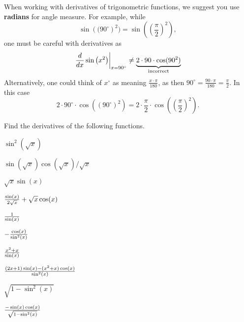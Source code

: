 \begin{warning}
When working with derivatives of trigonometric functions, we suggest
you use \textbf{radians} for angle measure. For example, while
\[
\sin\left((90^\circ\right)^2) = \sin\left(\left(\frac{\pi}{2}\right)^2\right),
\]
one must be careful with derivatives as
\[
\left. \frac{d}{dx} \sin\left(x^2\right)\right|_{x=90^\circ} \ne \underbrace{2\cdot 90\cdot \cos(90^2)}_{\text{incorrect}}
\]
Alternatively, one could think of $x^\circ$ as meaning
$\frac{x\cdot\pi}{180}$, as then $90^\circ = \frac{90\cdot\pi}{180} =
\frac{\pi}{2}$. In this case
\[
2\cdot 90^\circ\cdot \cos((90^\circ)^2) = 2\cdot \frac{\pi}{2}\cdot\cos\left(\left(\frac{\pi}{2}\right)^2\right).
\]
\end{warning}



\begin{exercises}
Find the derivatives of the following functions.

\twocol

\begin{exercise} $\sin^2(\sqrt{x})$
\begin{answer} $\sin(\sqrt{x})\cos(\sqrt{x})/\sqrt{x}$
\end{answer}\end{exercise}

\begin{exercise} $\sqrt{x}\sin(x)$
\begin{answer} ${\sin(x)\over2\sqrt x}+\sqrt{x}\cos(x)$
\end{answer}\end{exercise}

\begin{exercise} ${1\over \sin(x)}$
\begin{answer} $ -{\cos(x)\over \sin^2(x)}$
\end{answer}\end{exercise}

\begin{exercise} ${x^2+x\over \sin(x)}$
\begin{answer} ${(2x +1)\sin(x) - (x^2+x)\cos(x) \over \sin^2 (x)}$
\end{answer}\end{exercise}

\begin{exercise} $\sqrt{1-\sin^2(x)}$
\begin{answer} ${-\sin(x)\cos(x)\over \sqrt{1-\sin^2(x)}}$
\end{answer}\end{exercise}


\end{exercises}
